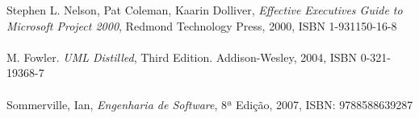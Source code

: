 

Stephen L. Nelson, Pat Coleman, Kaarin Dolliver, \textit{Effective Executives Guide to Microsoft Project 2000}, Redmond Technology Press, 2000, ISBN 1-931150-16-8\\ \\

M. Fowler. \textit{UML Distilled}, Third Edition. Addison-Wesley, 2004, ISBN 0-321-19368-7\\ \\

Sommerville, Ian, \textit{Engenharia de Software}, 8ª Edição, 2007, ISBN: 9788588639287


